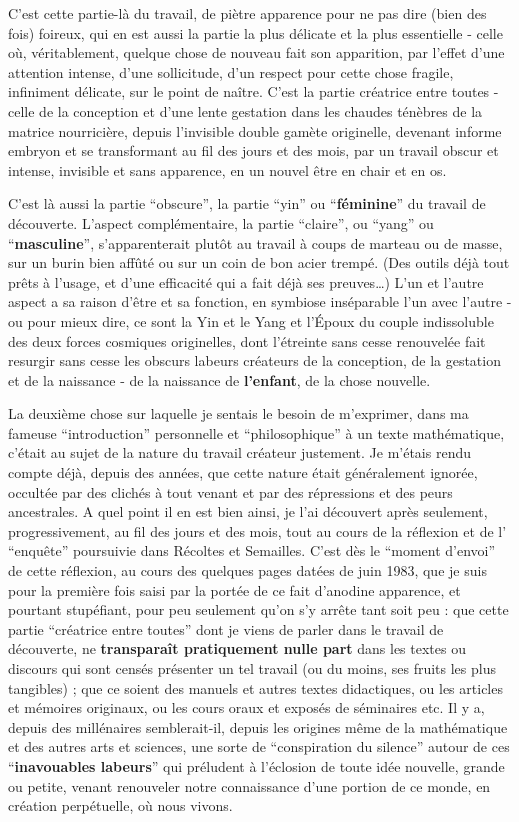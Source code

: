 C'est cette partie-là du travail, de piètre apparence pour ne pas dire (bien des fois) foireux, qui en est aussi la partie la plus délicate et la plus essentielle - celle où, véritablement, quelque chose de nouveau fait son apparition, par l'effet d'une attention intense, d'une sollicitude, d'un respect pour cette chose fragile, infiniment délicate, sur le point de naître. C'est la partie créatrice entre toutes - celle de la conception et d'une lente gestation dans les chaudes ténèbres de la matrice nourricière, depuis l'invisible double gamète originelle, devenant informe embryon et se transformant au fil des jours et des mois, par un travail obscur et intense, invisible et sans apparence, en un nouvel être en chair et en os.

C'est là aussi la partie ``obscure'', la partie ``yin'' ou ``\textbf{féminine}'' du travail de découverte. L'aspect complémentaire, la partie ``claire'', ou ``yang'' ou ``\textbf{masculine}'', s'apparenterait plutôt au travail à coups de marteau ou de masse, sur un burin bien affûté ou sur un coin de bon acier trempé. (Des outils déjà tout prêts à l'usage, et d'une efficacité qui a fait déjà ses preuves\ldots) L'un et l'autre aspect a sa raison d'être et sa fonction, en symbiose inséparable l'un avec l'autre - ou pour mieux dire, ce sont la Yin et le Yang et l'Époux du couple indissoluble des deux forces cosmiques originelles, dont l'étreinte sans cesse renouvelée fait resurgir sans cesse les obscurs labeurs créateurs de la conception, de la gestation et de la naissance - de la naissance de \textbf{l'enfant}, de la chose nouvelle.

La deuxième chose sur laquelle je sentais le besoin de m'exprimer, dans ma fameuse ``introduction'' personnelle et ``philosophique'' à un texte mathématique, c'était au sujet de la nature du travail créateur justement. Je m'étais rendu compte déjà, depuis des années, que cette nature était généralement ignorée, occultée par des clichés à tout venant et par des répressions et des peurs ancestrales. A quel point il en est bien ainsi, je l'ai découvert après seulement, progressivement, au fil des jours et des mois, tout au cours de la réflexion et de l' ``enquête'' poursuivie dans Récoltes et Semailles. C'est dès le ``moment d'envoi'' de cette réflexion, au cours des quelques pages datées de juin 1983, que je suis pour la première fois saisi par la portée de ce fait d'anodine apparence, et pourtant stupéfiant, pour peu seulement qu'on s'y arrête tant soit peu : que cette partie ``créatrice entre toutes'' dont je viens de parler dans le travail de découverte, ne \textbf{transparaît pratiquement nulle part} dans les textes ou discours qui sont censés présenter un tel travail (ou du moins, ses fruits les plus tangibles) ; que ce soient des manuels et autres textes didactiques, ou les articles et mémoires originaux, ou les cours oraux et exposés de séminaires etc. Il y a, depuis des millénaires semblerait-il, depuis les origines même de la mathématique et des autres arts et sciences, une sorte de ``conspiration du silence'' autour de ces ``\textbf{inavouables labeurs}'' qui préludent à l'éclosion de toute idée nouvelle, grande ou petite, venant renouveler notre connaissance d'une portion de ce monde, en création perpétuelle, où nous vivons.

